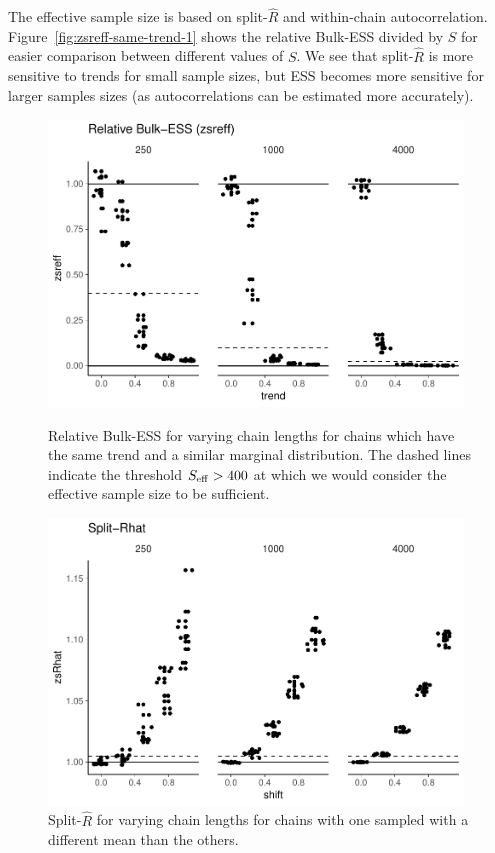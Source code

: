 \documentclass[american,]{article}
\theoremstyle{definition}
\begin{document}
The effective sample size is based on split-\(\widehat{R}\) and
within-chain autocorrelation. Figure~\ref{fig:zsreff-same-trend-1}
shows the relative Bulk-ESS divided by \(S\) for easier
comparison between different values of \(S\).
%
We see that split-\(\widehat{R}\) is more sensitive to trends for
small sample sizes, but ESS becomes more sensitive for larger samples
sizes (as autocorrelations can be estimated more accurately).
\begin{figure}[tp]
  \centering
  \begin{minipage}{0.48\textwidth}
  \includegraphics[width=0.98\textwidth]{graphics/zsreff-same-trend-1.pdf}
  \caption{Relative Bulk-ESS for varying chain lengths for chains which have
    the same trend and a similar marginal distribution. The dashed
    lines indicate the threshold \(S_{\rm eff} > 400\) at which we
    would consider the effective sample size to be sufficient.}
  \label{fig:zsreff-same-trend-1}
\end{minipage}
\hfill
  \begin{minipage}{0.48\textwidth}
  \includegraphics[width=0.98\textwidth]{graphics/zsrhat-shifted-chain-1.pdf}
  \caption{Split-\(\widehat{R}\) for varying chain lengths
    for chains with one sampled with a different mean than the others.\\~\\~}
  \label{fig:zsrhat-shifted-chain-1}
\end{minipage}
\end{figure}
\end{document}
